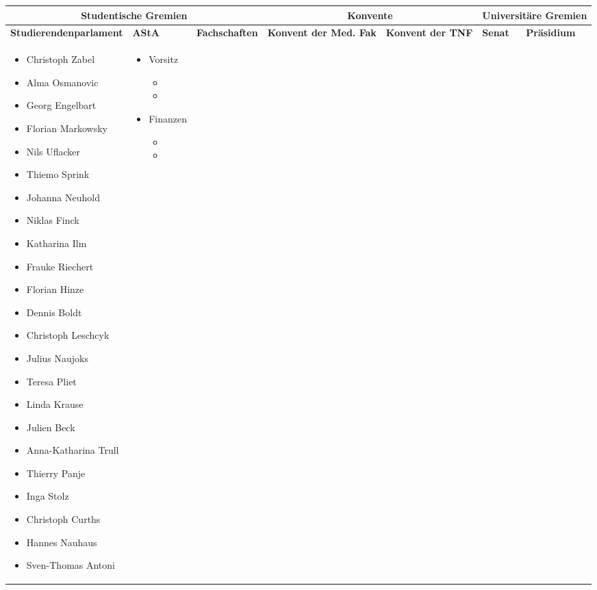 \documentclass[landscape,a0b,final]{a0poster}
\begin{document}
\begin{tabular}{|p{15cm}||p{15cm}||p{15cm}||p{15cm}||p{15cm}|||p{15cm}||p{15cm}|}
\hline
\multicolumn{3}{|c||}{Studentische Gremien} & \multicolumn{2}{||c|}{Konvente} & \multicolumn{2}{||c|}{Universitäre Gremien} \\
\hline
\hline
\textbf{Studierendenparlament} & \textbf{AStA} & \textbf{Fachschaften} & \textbf{Konvent der Med. Fak} &  \textbf{Konvent der TNF} & \textbf{Senat} & \textbf{Präsidium}\\
\begin{itemize}
\item Christoph Zabel
\item Alma Osmanovic
\item Georg Engelbart
\item Florian Markowsky
\item Nils Uflacker
\item Thiemo Sprink
\item Johanna Neuhold
\item Niklas Finck
\item Katharina Ilm
\item Frauke Riechert
\item Florian Hinze
\item Dennis Boldt
\item Christoph Leschcyk
\item Julius Naujoks
\item Teresa Pliet
\item Linda Krause
\item Julien Beck
\item Anna-Katharina Trull
\item Thierry Panje
\item Inga Stolz
\item Christoph Curths
\item Hannes Nauhaus
\item Sven-Thomas Antoni
\end{itemize}
&
\begin{itemize}
\item Vorsitz
\begin{itemize}
\item
\item
\end{itemize}
\item Finanzen
\begin{itemize}
\item
\item
\end{itemize}

\end{itemize}
\end{tabular}
\end{document}
